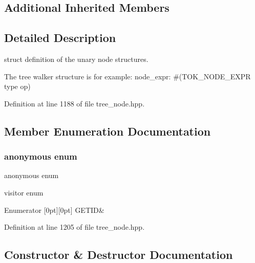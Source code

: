 \subsection*{Additional Inherited Members}


\subsection{Detailed Description}
struct definition of the unary node structures. 

The tree walker structure is for example\+: node\+\_\+expr\+: \#(T\+O\+K\+\_\+\+N\+O\+D\+E\+\_\+\+E\+X\+PR type op) 

Definition at line 1188 of file tree\+\_\+node.\+hpp.



\subsection{Member Enumeration Documentation}
\mbox{\label{structunary__expr_ab2b0179fe9274c67ce05531dd4db45ac}} 
\subsubsection{\texorpdfstring{anonymous enum}{anonymous enum}}
{\footnotesize\ttfamily anonymous enum}



visitor enum 

\begin{DoxyEnumFields}{Enumerator}
[0pt][0pt]{}\mbox{\label{structunary__expr_ab2b0179fe9274c67ce05531dd4db45acace6e39f05809bdcc6b4ddaf837c13f62}} 
G\+E\+T\+ID&\\
\hline

\end{DoxyEnumFields}


Definition at line 1205 of file tree\+\_\+node.\+hpp.



\subsection{Constructor \& Destructor Documentation}
\mbox{\label{structunary__expr_a1d306a0ee4139f852cee58b546c60ae1}} 
